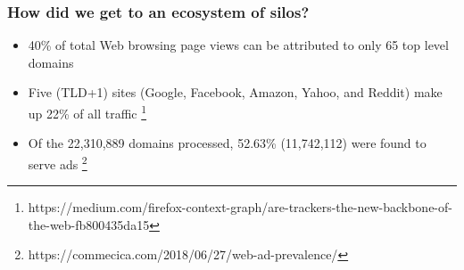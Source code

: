 \documentclass[aspectratio=169]{beamer}
\begin{document}
{
%
\begin{frame}
\frametitle{How did we get to an ecosystem of silos?}
\begin{itemize}
\item{40\% of total Web browsing page views can be attributed to only 65 top level domains}
\item{Five (TLD+1) sites (Google, Facebook, Amazon, Yahoo, and Reddit) make up 22\% of all traffic
\footnote{https://medium.com/firefox-context-graph/are-trackers-the-new-backbone-of-the-web-fb800435da15}}
\item{Of the 22,310,889 domains processed, 52.63\% (11,742,112) were found to serve ads
\footnote{https://commecica.com/2018/06/27/web-ad-prevalence/}}


\end{itemize}
\end{frame}
}
\end{document}
